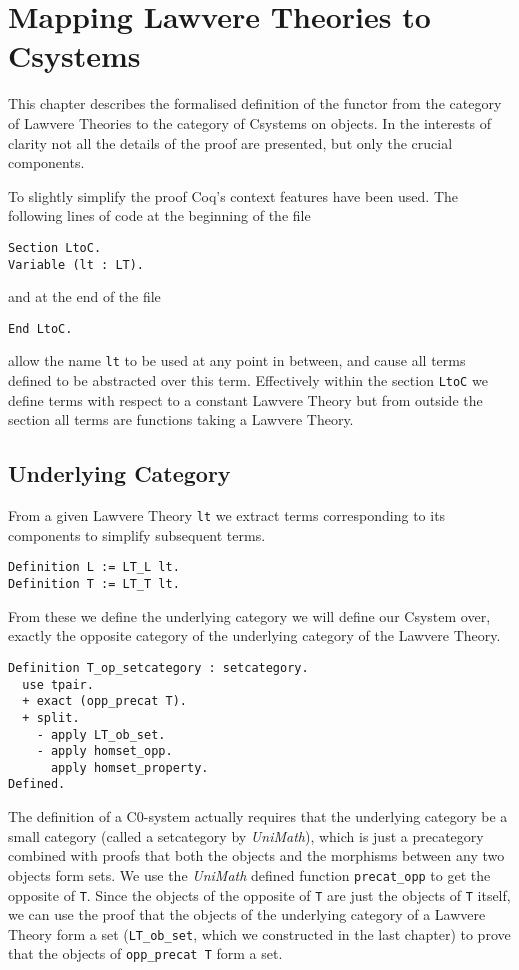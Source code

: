 \chapter{Mapping Lawvere Theories to Csystems}
This chapter describes the formalised definition of the functor from the
category of Lawvere Theories to the category of Csystems on objects. In the
interests of clarity not all the details of the proof are presented, but only
the crucial components.

To slightly simplify the proof Coq's context features have been used. The
following lines of code at the beginning of the file
\begin{lstlisting}
Section LtoC.
Variable (lt : LT).
\end{lstlisting}
and at the end of the file
\begin{lstlisting}
End LtoC.
\end{lstlisting}
allow the name \lstinline|lt| to be used at any point in between, and cause all terms
defined to be abstracted over this term. Effectively within the section
\lstinline|LtoC| we define terms with respect to a constant Lawvere Theory but from
outside the section all terms are functions taking a Lawvere Theory.

\section{Underlying Category}
From a given Lawvere Theory \lstinline|lt| we extract terms corresponding to its
components to simplify subsequent terms.
\begin{lstlisting}
Definition L := LT_L lt.
Definition T := LT_T lt.
\end{lstlisting}

From these we define the underlying category we will define our Csystem over,
exactly the opposite category of the underlying category of the Lawvere Theory.
\begin{lstlisting}
Definition T_op_setcategory : setcategory.
  use tpair.
  + exact (opp_precat T).
  + split.
    - apply LT_ob_set.
    - apply homset_opp.
      apply homset_property.
Defined.
\end{lstlisting}
The definition of a C0-system actually requires that the underlying category be
a small category (called a setcategory by \textit{UniMath}), which is just a
precategory combined with proofs that both the objects and the morphisms between
any two objects form sets. We use the \textit{UniMath} defined function
\lstinline|precat_opp| to get the opposite of \lstinline|T|. Since the objects of the
opposite of \lstinline|T| are just the objects of \lstinline|T| itself, we can use the
proof that the objects of the underlying category of a Lawvere Theory form a set
(\lstinline|LT_ob_set|, which we constructed in the last chapter) to prove that the
objects of \lstinline|opp_precat T| form a set. 

